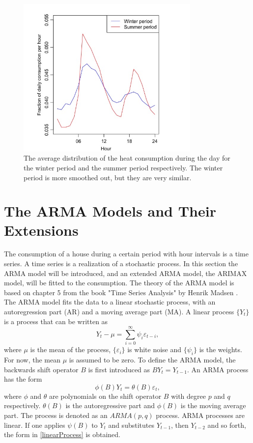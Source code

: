 \begin{figure}
    \centering
    \includegraphics[width=0.8\textwidth]{../../../figures/Season_distribution.jpeg}
    \caption{The average distribution of the heat consumption during the day for the winter period and the summer period respectively. The winter period is more smoothed out, but they are very similar.}
    \label{fig: Season_dist}
\end{figure}


\section{The ARMA Models and Their Extensions}
The consumption of a house during a certain period with hour intervals is a time series. A time series is a realization of a stochastic process. In this section the ARMA model will be introduced, and an extended ARMA model, the ARIMAX model, will be fitted to the consumption. The theory of the ARMA model is based on chapter 5 from the book "Time Series Analysis" by Henrik Madsen \cite{Time_Series_Analysis}. The ARMA model fits the data to a linear stochastic process, with an autoregression part (AR) and a moving average part (MA). A linear process $\{Y_t\}$ is a process that can be written as
\begin{equation}
    Y_t - \mu = \sum_{i=0}^{\infty} \psi_i \varepsilon_{t-i}, \label{linearProcess}
\end{equation}
where $\mu$ is the mean of the process, $\{\varepsilon_i\}$ is white noise and $\{\psi_i\}$ is the weights. For now, the mean $\mu$ is assumed to be zero. To define the ARMA model, the backwards shift operator $B$ is first introduced as $BY_t = Y_{t-1}$. An ARMA process has the form
\begin{equation}
    \phi (B)Y_t = \theta (B) \varepsilon_t,
\end{equation}
where $\phi$ and $\theta$ are polynomials on the shift operator $B$ with degree $p$ and $q$ respectively. $\theta(B)$ is the autoregressive part and $\phi(B)$ is the moving average part. The process is denoted as an $ARMA(p,q)$ process. ARMA processes are linear. If one applies $\psi(B)$ to $Y_t$ and substitutes $Y_{t-1}$, then $Y_{t-2}$ and so forth, the form in \cref{linearProcess} is obtained.

